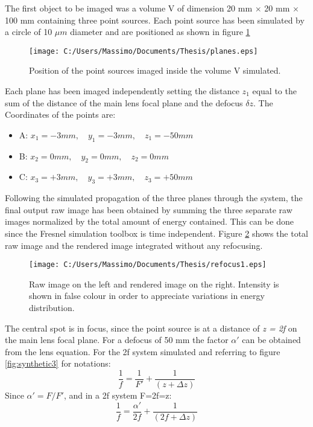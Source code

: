 The first object to be imaged was a volume V of dimension 20 mm $\times$ 20 mm $\times$ 100 mm containing three point sources. Each point source has been simulated by a circle of 10 $\mu m$ diameter and are positioned as shown in figure \ref{fig:volumepoint}
\begin{figure}[H]
	\centering
	\texttt{[image: C:/Users/Massimo/Documents/Thesis/planes.eps]}
	\caption{\label{fig:volumepoint} Position of the point sources imaged inside the volume V simulated. }
\end{figure}
Each plane has been imaged independently setting the distance $z_1$ equal to the sum of the distance of the main lens focal plane and the defocus $\delta z$. The Coordinates of the points are: 
\begin{itemize}
	\item A: $x_1 = -3 mm , \quad y_1 = -3 mm , \quad z_1 = -50 mm$
	\item B: $x_2 = 0 mm, \quad y_2 = 0 mm, \quad z_2 = 0 mm$ 
	\item C: $x_3 = +3 mm , \quad y_3 = +3 mm, \quad z_3 = +50 mm$
	\end{itemize} 
Following the simulated propagation of the three planes through the system, the final output raw image has been obtained by summing the three separate raw images normalized by the total amount of energy contained. This can be done since the Fresnel simulation toolbox is time independent. Figure \ref{fig:rawandimage} shows the total raw image and the rendered image integrated without any refocusing.
\begin{figure}[H]
	\centering
	\texttt{[image: C:/Users/Massimo/Documents/Thesis/refocus1.eps]}
	\caption{\label{fig:rawandimage} Raw image on the left and rendered image on the right. Intensity is shown in false colour in order to appreciate variations in energy distribution. }
\end{figure}
The central spot is in focus, since the point source is at a distance of \textit{z = 2f} on the main lens focal plane.
For a defocus of 50 mm the factor $ \alpha'$ can be obtained from the lens equation. For the 2f system simulated and referring to figure \ref{fig:synthetic3} for notations:
\begin{equation}
\label{eq:alpha1}
\dfrac{1}{f} =\dfrac{1}{F'}+\dfrac{1}{(z+\Delta z)} 	
\end{equation}
Since $ \alpha' = F/F'$, and in a 2f system F=2f=z:
\begin{equation}
\label{eq:alpha2}
\dfrac{1}{f} =\dfrac{ \alpha'}{2f}+\dfrac{1}{(2f+\Delta z)} 	
\end{equation}
